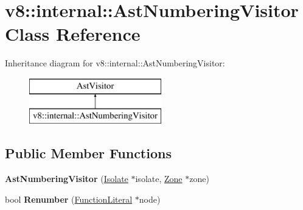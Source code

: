 \hypertarget{classv8_1_1internal_1_1_ast_numbering_visitor}{}\section{v8\+:\+:internal\+:\+:Ast\+Numbering\+Visitor Class Reference}
\label{classv8_1_1internal_1_1_ast_numbering_visitor}
Inheritance diagram for v8\+:\+:internal\+:\+:Ast\+Numbering\+Visitor\+:\begin{figure}[H]
\begin{center}
\leavevmode
\includegraphics[height=2.000000cm]{classv8_1_1internal_1_1_ast_numbering_visitor}
\end{center}
\end{figure}
\subsection*{Public Member Functions}
\begin{DoxyCompactItemize}
\item 
{\bfseries Ast\+Numbering\+Visitor} (\hyperlink{classv8_1_1internal_1_1_isolate}{Isolate} $\ast$isolate, \hyperlink{classv8_1_1internal_1_1_zone}{Zone} $\ast$zone)\hypertarget{classv8_1_1internal_1_1_ast_numbering_visitor_a010b1971412f010ce1075dd7c19fbe4f}{}\label{classv8_1_1internal_1_1_ast_numbering_visitor_a010b1971412f010ce1075dd7c19fbe4f}

\item 
bool {\bfseries Renumber} (\hyperlink{classv8_1_1internal_1_1_function_literal}{Function\+Literal} $\ast$node)\hypertarget{classv8_1_1internal_1_1_ast_numbering_visitor_ac69aa83326191d03a722d808f2ff0695}{}\label{classv8_1_1internal_1_1_ast_numbering_visitor_ac69aa83326191d03a722d808f2ff0695}

\end{DoxyCompactItemize}
